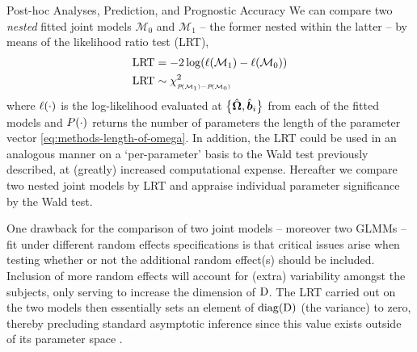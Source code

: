 \begin{chapter}{\label{cha:posthoc}Post-hoc Analyses, Prediction, and Prognostic Accuracy}
We can compare two \textit{nested} fitted joint models $\mathcal{M}_0$ and $\mathcal{M}_1$ -- the former nested within the latter -- by means of the likelihood ratio test (LRT), 
\begin{equation}
    \begin{aligned}
        \mathrm{LRT} &= -2\log\!\left(\ell\!\left(\mathcal{M}_1\right)-\ell\!\left(\mathcal{M}_0\right)\right)\\
        \mathrm{LRT} &\sim \chi^2_{{}_{P\!\left(\mathcal{M}_1\right)-P\!\left(\mathcal{M}_0\right)}}
    \end{aligned}
\label{eq:posthocs-LRT}    
\end{equation}
where $\ell\!\left(\cdot\right)$ is the log-likelihood evaluated at $\big\{\hat{\bm{\Omega}},\hat{\bm{b}}_i\big\}$ from each of the fitted models and $P\!\left(\cdot\right)$ returns the number of parameters \ie the length of the parameter vector \eqref{eq:methods-length-of-omega}. In addition, the LRT could be used in an analogous manner on a `per-parameter' basis to the Wald test previously described, at (greatly) increased computational expense. Hereafter we compare two nested joint models by LRT and appraise individual parameter significance by the Wald test.

One drawback for the comparison of two joint models -- moreover two GLMMs -- fit under different random effects specifications is that critical issues arise when testing whether or not the additional random effect(s) should be included. Inclusion of more random effects will account for (extra) variability amongst the subjects, only serving to increase the dimension of $\mathrm{D}$. The LRT carried out on the two models then essentially sets an element of $\mathrm{diag}\!\left(\mathrm{D}\right)$ (\ie the variance) to zero, thereby precluding standard asymptotic inference since this value exists outside of its parameter space \citep{RizopoulosJMbook}.


\end{chapter}
